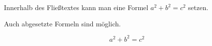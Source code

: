 \documentclass[12pt,ngerman]{scrartcl}
\begin{document}
Innerhalb des Fließtextes kann man eine Formel $a^2 + b^2 = c^2$ setzen.

Auch abgesetzte Formeln sind möglich.

\[ a^2 + b^2 = c^2 \]
\end{document}
